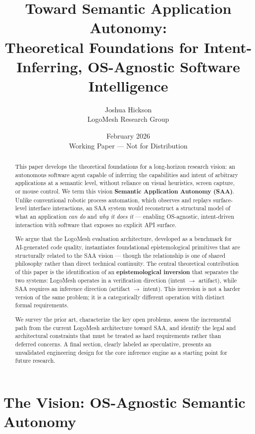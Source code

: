 \documentclass[11pt, a4paper]{article}
\title{Toward Semantic Application Autonomy:\\
\large Theoretical Foundations for Intent-Inferring, OS-Agnostic Software Intelligence}
\author{Joshua Hickson \\ \small LogoMesh Research Group}
\date{February 2026 \\ \vspace{0.5em} \small Working Paper — Not for Distribution}
\begin{document}
\maketitle

\begin{abstract}
This paper develops the theoretical foundations for a long-horizon research vision: an autonomous software agent capable of inferring the capabilities and intent of arbitrary applications at a semantic level, without reliance on visual heuristics, screen capture, or mouse control. We term this vision \textbf{Semantic Application Autonomy (SAA)}. Unlike conventional robotic process automation, which observes and replays surface-level interface interactions, an SAA system would reconstruct a structural model of what an application \emph{can do} and \emph{why it does it} — enabling OS-agnostic, intent-driven interaction with software that exposes no explicit API surface.

We argue that the LogoMesh evaluation architecture, developed as a benchmark for AI-generated code quality, instantiates foundational epistemological primitives that are structurally related to the SAA vision — though the relationship is one of shared philosophy rather than direct technical continuity. The central theoretical contribution of this paper is the identification of an \textbf{epistemological inversion} that separates the two systems: LogoMesh operates in a verification direction (intent $\to$ artifact), while SAA requires an inference direction (artifact $\to$ intent). This inversion is not a harder version of the same problem; it is a categorically different operation with distinct formal requirements.

We survey the prior art, characterize the key open problems, assess the incremental path from the current LogoMesh architecture toward SAA, and identify the legal and architectural constraints that must be treated as hard requirements rather than deferred concerns. A final section, clearly labeled as speculative, presents an unvalidated engineering design for the core inference engine as a starting point for future research.
\end{abstract}

\tableofcontents
\vspace{1em}

\section{The Vision: OS-Agnostic Semantic Autonomy}
\end{document}
